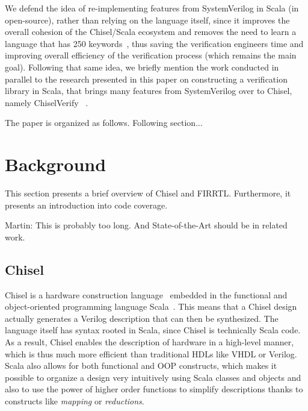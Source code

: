 \documentclass[conference]{IEEEtran}
\newcommand{\martin}[1]{{\color{blue} Martin: #1}}
\begin{document}
We defend the idea of re-implementing features from SystemVerilog in Scala (in open-source), rather than relying on the language itself, since it improves the overall cohesion of the Chisel/Scala ecosystem and removes the need to learn a language that has 250 keywords~\cite{SystemVerilog}, thus saving the verification engineers time and improving overall efficiency of the verification process (which remains the main goal). Following that same idea, we briefly mention the work conducted in parallel to the research presented in this paper on constructing a verification library in Scala, that brings many features from SystemVerilog over to Chisel, namely ChiselVerify~\cite{blind} %
.

The paper is organized as follows.
Following section...

\section{Background}
\label{sec:background}
This section presents a brief overview of Chisel and FIRRTL. Furthermore, it presents an introduction into code coverage.

\martin{This is probably too long. And State-of-the-Art should be in related work.}

\subsection{Chisel}
Chisel is a hardware construction language~\cite{chisel:dac2012, chisel:book} embedded in the functional and object-oriented programming language Scala~\cite{Scala}. This means that a Chisel design actually generates a Verilog description that can then be synthesized. The language itself has syntax rooted in Scala, since Chisel is technically Scala code. As a result, Chisel enables the description of hardware in a high-level manner, which is thus much more efficient than traditional HDLs like VHDL or Verilog. Scala also allows for both functional and OOP constructs, which makes it possible to organize a design very intuitively using Scala classes and objects and also to use the power of higher order functions to simplify descriptions thanks to constructs like \textit{mapping} or \textit{reductions}.
\end{document}
